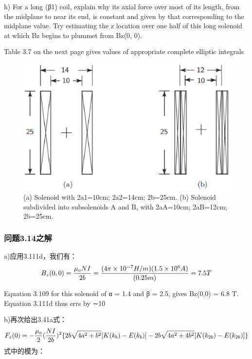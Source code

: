 h) For a long (β1) coil, explain why its axial force over most of its length, from
the midplane to near its end, is constant and given by that corresponding to
the midplane value. Try estimating the z location over one half of this long
solenoid at which Bz begins to plummet from Bz(0, 0).

Table 3.7 on the next page gives values of appropriate complete elliptic integrals

\begin{figure}[htbp]
	\centering
	\includegraphics[scale=0.5]{chpt3/figs/fig3.43.eps}
	\caption{(a) Solenoid with 2a1=10cm; 2a2=14cm; 2b=25cm. (b) Solenoid subdivided
		into subsolenoids A and B, with 2aA=10cm; 2aB=12cm; 2b=25cm.}
\end{figure}


\subsubsection{问题3.14之解}


a)应用3.111d，我们有：
$$
B_{z}(0,0)=\frac{\mu_{o}NI}{2b}\\%
=\frac{(4\pi\times10^{-7}H/m)(1.5\times10^{6}A)}{(0.25m)}=7.5T\\
$$

Equation 3.109 for this solenoid of α = 1.4 and β = 2.5, gives Bz(0,0) = 6.8 T.
Equation 3.111d thus errs by ∼10%

b)再次给出3.41a式：
$$
F_{z}(0)=-\frac{\mu_{o}}{2}(\frac{NI}{2b})^{2}\{2b\sqrt{4a^{2}+b^{2}}[K(k_{b})-E(k_{b})]\\
-2b\sqrt{4a^{2}+4b^{2}}[K(k_{2b})-E(k_{2b})]\}\\%
$$
式中的模为：


